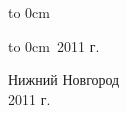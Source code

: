 \documentclass[12pt, a4paper]{article}
\begin{document}
\begin{titlepage}
\begin{multicols}{2}
\vspace*{1em}
{ \noindent
\hspace*{1.5cm}\hbox to 0cm{}\hspace{-1.5cm}{\hrulefill\ Турлапов В. Е. }
}

\vspace*{1.0em}
{ \noindent\newcommand{\z}{\textbf{Задача. }}
\hbox to 0cm{\raisebox{0.25em}{<<\ \ \ \ \ \  >>}}{\hrulefill\ 2011 г. }
}
\end{multicols}

\vfill 
\begin{center} 
{\rm \large Нижний Новгород \\ 2011 г.} 
\end {center} 
\end{titlepage} 

\tableofcontents

\newpage
\end{document}
